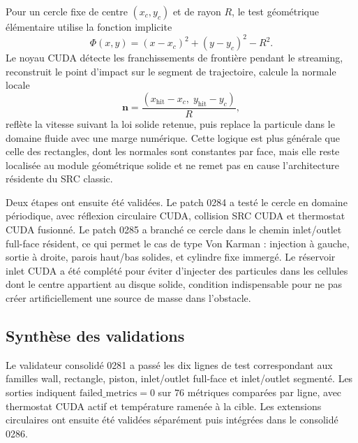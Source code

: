 \documentclass[11pt,a4paper]{article}
\begin{document}
Pour un cercle fixe de centre $(x_c,y_c)$ et de rayon $R$, le test géométrique élémentaire utilise la fonction implicite
\begin{equation}
  \Phi(x,y) = (x-x_c)^2 + (y-y_c)^2 - R^2.
\end{equation}
Le noyau CUDA détecte les franchissements de frontière pendant le streaming, reconstruit le point d'impact sur le segment de trajectoire, calcule la normale locale
\begin{equation}
  \mathbf{n} = \frac{(x_{\mathrm{hit}}-x_c,\; y_{\mathrm{hit}}-y_c)}{R},
\end{equation}
reflète la vitesse suivant la loi solide retenue, puis replace la particule dans le domaine fluide avec une marge numérique. Cette logique est plus générale que celle des rectangles, dont les normales sont constantes par face, mais elle reste localisée au module géométrique solide et ne remet pas en cause l'architecture résidente du SRC classic.

Deux étapes ont ensuite été validées. Le patch 0284 a testé le cercle en domaine périodique, avec réflexion circulaire CUDA, collision SRC CUDA et thermostat CUDA fusionné. Le patch 0285 a branché ce cercle dans le chemin inlet/outlet full-face résident, ce qui permet le cas de type Von Karman : injection à gauche, sortie à droite, parois haut/bas solides, et cylindre fixe immergé. Le réservoir inlet CUDA a été complété pour éviter d'injecter des particules dans les cellules dont le centre appartient au disque solide, condition indispensable pour ne pas créer artificiellement une source de masse dans l'obstacle.

\subsection{Synthèse des validations}

Le validateur consolidé 0281 a passé les dix lignes de test correspondant aux familles wall, rectangle, piston, inlet/outlet full-face et inlet/outlet segmenté. Les sorties indiquent $\mathrm{failed\_metrics}=0$ sur $76$ métriques comparées par ligne, avec thermostat CUDA actif et température ramenée à la cible. Les extensions circulaires ont ensuite été validées séparément puis intégrées dans le consolidé 0286.
\end{document}
